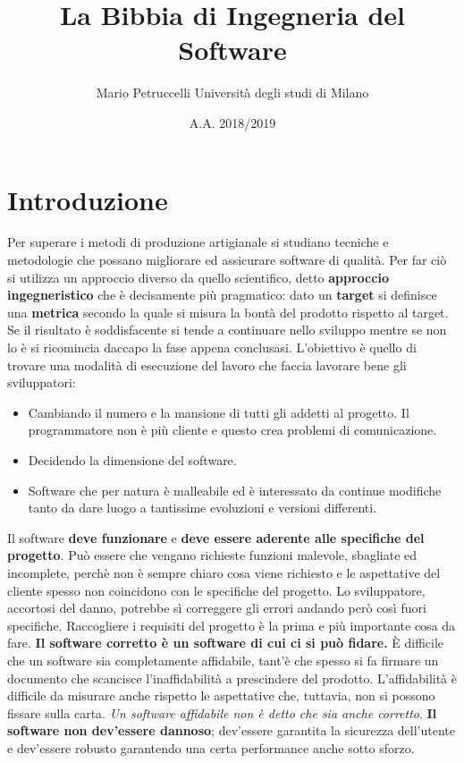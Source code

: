 \documentclass[12pt, twoside, letterpaper]{article}
\title{La Bibbia di Ingegneria del Software}
\author{Mario Petruccelli \cr Università degli studi di Milano}
\date{A.A. 2018/2019}
\begin{document}
	\begin{titlepage} \maketitle \newpage \tableofcontents \end{titlepage}
	
	\section{Introduzione}
		Per superare i metodi di produzione artigianale si studiano tecniche e metodologie che possano migliorare ed assicurare software di qualità. Per far ciò si utilizza un approccio diverso da quello scientifico, detto \textbf{approccio ingegneristico} che è decisamente più pragmatico: dato un \textbf{target} si definisce una \textbf{metrica} secondo la quale si misura la bontà del prodotto rispetto al target. Se il risultato è soddisfacente si tende a continuare nello sviluppo mentre se non lo è si ricomincia daccapo la fase appena conclusasi. L'obiettivo è quello di trovare una modalità di esecuzione del lavoro che faccia lavorare bene gli sviluppatori:
		\begin{itemize}
			\item Cambiando il numero e la mansione di tutti gli addetti al progetto. Il programmatore non è più cliente e questo crea problemi di comunicazione.
			\item Decidendo la dimensione del software. 
			\item Software che per natura è malleabile ed è interessato da continue modifiche tanto da dare luogo a tantissime evoluzioni e versioni differenti.
		\end{itemize}
		Il software \textbf{deve funzionare} e \textbf{deve essere aderente alle specifiche del progetto}. Può essere che vengano richieste funzioni malevole, sbagliate ed incomplete, perchè non è sempre chiaro cosa viene richiesto e le aspettative del cliente spesso non coincidono con le specifiche del progetto. Lo sviluppatore, accortosi del danno, potrebbe sì correggere gli errori andando però così fuori specifiche. Raccogliere i requisiti del progetto è la prima e più importante cosa da fare. \textbf{Il software corretto è un software di cui ci si può fidare.} È difficile che un software sia completamente affidabile, tant'è che spesso si fa firmare un documento che scancisce l'inaffidabilità a prescindere del prodotto. L'affidabilità è difficile da misurare anche rispetto le aspettative che, tuttavia, non si possono fissare sulla carta. \textit{Un software affidabile non è detto che sia anche corretto}. \textbf{Il software non dev'essere dannoso}; dev'essere garantita la sicurezza dell'utente e dev'essere robusto garantendo una certa performance anche sotto sforzo.
		
\end{document}
